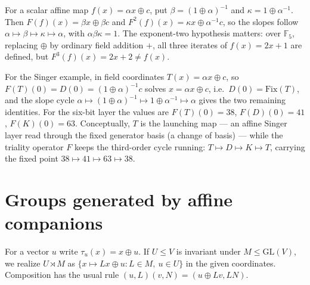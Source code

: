 \documentclass[11pt]{article}
\begin{document}
For a scalar affine map $f(x)=\alpha x\oplus c$, put
$\beta=(1\oplus\alpha)^{-1}$ and $\kappa=1\oplus\alpha^{-1}$.
Then $F(f)(x)=\beta x\oplus\beta c$ and
$F^2(f)(x)=\kappa x\oplus\alpha^{-1}c$, so the slopes follow
$\alpha\mapsto\beta\mapsto\kappa\mapsto\alpha$, with
$\alpha\beta\kappa=1$. The exponent-two hypothesis matters: over
$\mathbb F_5$, replacing $\oplus$ by ordinary field addition $+$,
all three iterates of $f(x)=2x+1$ are defined, but
$F^3(f)(x)=2x+2\ne f(x)$.

For the Singer example, in field coordinates
$T(x)=\alpha x\oplus c$, so
$F(T)(0)=D(0)=(1\oplus\alpha)^{-1}c$ solves $x=\alpha x\oplus c$, i.e.\
$D(0)=\mathrm{Fix}(T)$, and the slope cycle
$\alpha\mapsto(1\oplus\alpha)^{-1}\mapsto1\oplus\alpha^{-1}\mapsto\alpha$ gives the
two remaining identities. For the six-bit layer the values are $F(T)(0)=38$,
$F(D)(0)=41$, $F(K)(0)=63$.
Conceptually, $T$ is the launching map --- an affine Singer layer read through the
fixed generator basis (a change of basis) --- while the triality operator $F$ keeps
the third-order cycle running: $T\mapsto D\mapsto K\mapsto T$, carrying the fixed
point $38\mapsto41\mapsto63\mapsto38$.

\section{Groups generated by affine companions}\label{sec:group}
For a vector $u$ write $\tau_u(x)=x\oplus u$.
If $U\le V$ is invariant under $M\le\mathrm{GL}(V)$, we realize
$U\rtimes M$ as $\{x\mapsto Lx\oplus u:L\in M,\ u\in U\}$ in the given coordinates.
Composition has the usual rule $(u,L)(v,N)=(u\oplus Lv,LN)$.
\end{document}
